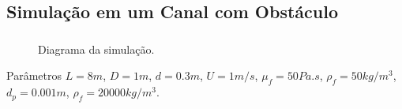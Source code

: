 \documentclass{beamer}
\begin{document}
\subsection*{Simulação em um Canal com Obstáculo}
\begin{frame}
  \frametitle{\subsecname}
  
  \begin{figure}
     {\raggedleft \tiny Diagrama da simulação.}
  \end{figure}
  \begin{block}{Parâmetros}
    $L=8m$, $D=1m$, $d=0.3m$, $U=1m/s$, $\mu_f=50Pa.s$, $\rho_f=50kg/m^3$, $d_p=0.001m$, $\rho_f=20000kg/m^3$.
  \end{block}
\end{frame}
\end{document}
